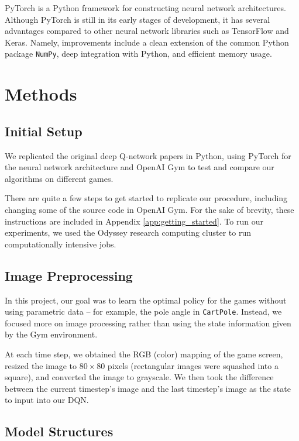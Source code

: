\documentclass[11pt]{article}
\newcommand{\cp}{\texttt{CartPole}}
\begin{document}
PyTorch \cite{paszke2017pytorch} is a Python framework for constructing neural network architectures. Although PyTorch is still in its early stages of development, it has several advantages compared to other neural network libraries such as TensorFlow and Keras. Namely, improvements include a clean extension of the common Python package \texttt{NumPy}, deep integration with Python, and efficient memory usage. 

\section{Methods}

\subsection{Initial Setup}

We replicated the original deep Q-network papers \cite{mnih2013playing, mnih2015human} in Python, using PyTorch \cite{paszke2017pytorch} for the neural network architecture and OpenAI Gym \cite{brockman2016openai} to test and compare our algorithms on different games. 

There are quite a few steps to get started to replicate our procedure, including changing some of the source code in OpenAI Gym. For the sake of brevity, these instructions are included in Appendix \ref{app:getting_started}. To run our experiments, we used the Odyssey research computing cluster to run computationally intensive jobs.

\subsection{Image Preprocessing}

In this project, our goal was to learn the optimal policy for the games without using parametric data -- for example, the pole angle in \cp. Instead, we focused more on image processing rather than using the state information given by the Gym environment.

At each time step, we obtained the RGB (color) mapping of the game screen, resized the image to $80 \times 80$ pixels (rectangular images were squashed into a square), and converted the image to grayscale. We then took the difference between the current timestep's image and the last timestep's image as the state to input into our DQN. 

\subsection{Model Structures}
\label{subsec:model_structure}
\end{document}
